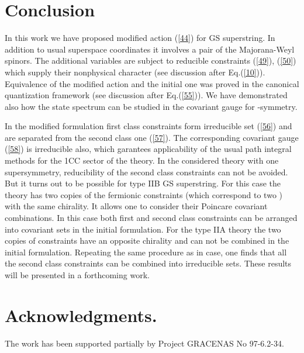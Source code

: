 \documentclass[a4paper]{article}
\begin{document}
\section{Conclusion}

In this work we have proposed modified action (\ref{44}) for \coordHE{} GS 
superstring. In addition to usual superspace coordinates it involves a 
pair of the Majorana-Weyl spinors. The additional variables are subject 
to reducible constraints (\ref{49}), (\ref{50}) which supply their 
nonphysical character (see discussion after Eq.(\ref{10})). Equivalence 
of the modified action and the initial one was proved in the canonical 
quantization framework (see discussion after Eq.(\ref{55})). We have 
demonstrated also how the state spectrum can be studied in the covariant 
gauge for \myHighlight{$\kappa$}\coordHE{}-symmetry.

In the modified formulation first class constraints form irreducible set 
(\ref{56}) and are separated from the second class one (\ref{57}). The 
corresponding covariant gauge (\ref{58}) is irreducible also, which 
garantees applicability of the usual path integral methods for the 1CC 
sector of the theory. In the considered theory with one supersymmetry, 
reducibility of the second class constraints can not be avoided. But it 
turns out to be possible for type IIB GS superstring. For this case the  
theory has two copies of the fermionic constraints (which correspond 
to two \coordHE{}) with the same chirality. It allows one to 
consider their Poincare covariant combinations. In this case both first 
and second class constraints can be arranged into covariant sets in the 
initial formulation. For the type IIA theory the two copies of 
constraints have an opposite chirality and can not be combined in the 
initial formulation. Repeating the same procedure as in \coordHE{} case, one 
finds that all the second class constraints  
can be combined into irreducible sets.   
These results will be presented in a forthcoming work.


\section*{Acknowledgments.}

The work has been supported partially by Project GRACENAS No 97-6.2-34.
 
\end{document}
